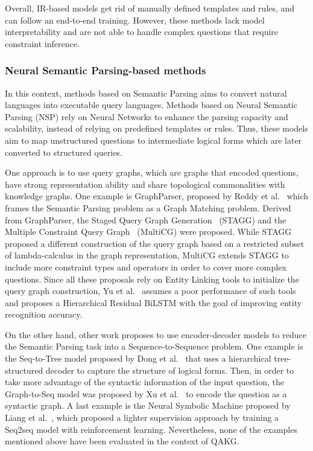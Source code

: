 Overall, IR-based models get rid of manually defined templates and rules, and can follow an 
end-to-end training. However, these methods lack model interpretability and are not able to 
handle complex questions that require constraint inference.

\subsubsection{Neural Semantic Parsing-based methods}
\label{cap2:qakg/approaches/neuSemParsing}
In this context, methods based on Semantic Parsing aims to convert natural languages into 
executable query languages. Methods based on Neural Semantic Parsing (NSP) rely on Neural 
Networks to enhance the parsing capacity and scalability, instead of relying on predefined 
templates or rules. Thus, these models aim to map unstructured questions to intermediate 
logical forms which are later converted to structured queries.

One approach is to use query graphs, which are graphs that encoded questions, have strong 
representation ability and share topological commonalities with knowledge graphs. One example 
is GraphParser, proposed by Reddy et al.~\cite{qa:ReddyLS14} which frames the Semantic Parsing 
problem as a Graph Matching problem. Derived from GraphParser, the Staged Query Graph 
Generation~\cite{qa:YihCHG15} (STAGG) and the Multiple Constraint Query Graph~\cite{qa:BaoDYZZ16} 
(MultiCG) were proposed. While STAGG proposed a different construction of the query graph based 
on a restricted subset of lambda-calculus in the graph representation, MultiCG extends STAGG to 
include more constraint types and operators in order to cover more complex questions. Since all 
these proposals rely on Entity Linking tools to initialize the query graph construction, 
Yu et al.~\cite{qa:YuYHSXZ17} assumes a poor performance of such tools and proposes a 
Hierarchical Residual BiLSTM with the goal of improving entity recognition accuracy.

On the other hand, other work proposes to use encoder-decoder models to reduce the Semantic 
Parsing task into a Sequence-to-Sequence problem. One example is the Seq-to-Tree model proposed 
by Dong et al.~\cite{nmt:DongL16} that uses a hierarchical tree-structured decoder to capture 
the structure of logical forms. Then, in order to take more advantage of the syntactic 
information of the input question, the Graph-to-Seq model was proposed by Xu et al.~\cite{qa:XuWWYCS18} 
to encode the question as a syntactic graph. A last example is the Neural Symbolic Machine 
proposed by Liang et al.~\cite{qa:LiangBLFL17}, which proposed a lighter supervision approach 
by training a Seq2seq model with reinforcement learning. Nevertheless, none of the examples 
mentioned above have been evaluated in the context of QAKG.

